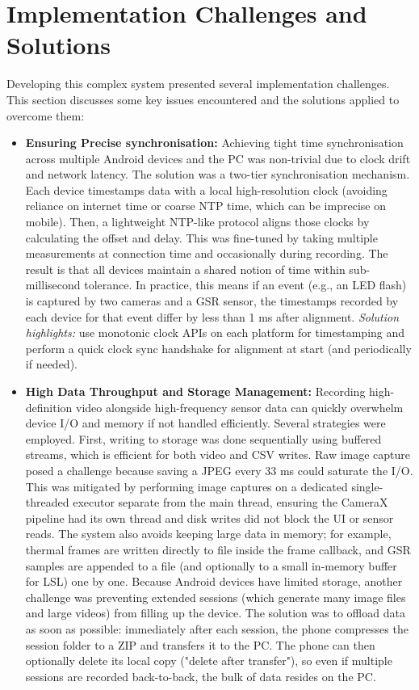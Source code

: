 \section{Implementation Challenges and Solutions}\label{sec:4-6}
Developing this complex system presented several implementation challenges. This section discusses some key issues encountered and the solutions applied to overcome them:

\begin{itemize}
    \item \textbf{Ensuring Precise synchronisation:} Achieving tight time synchronisation across multiple Android devices and the PC was non-trivial due to clock drift and network latency. The solution was a two-tier synchronisation mechanism. Each device timestamps data with a local high-resolution clock (avoiding reliance on internet time or coarse NTP time, which can be imprecise on mobile). Then, a lightweight NTP-like protocol aligns those clocks by calculating the offset and delay. This was fine-tuned by taking multiple measurements at connection time and occasionally during recording. The result is that all devices maintain a shared notion of time within sub-millisecond tolerance. In practice, this means if an event (e.g., an LED flash) is captured by two cameras and a GSR sensor, the timestamps recorded by each device for that event differ by less than 1 ms after alignment. \emph{Solution highlights:} use monotonic clock APIs on each platform for timestamping and perform a quick clock sync handshake for alignment at start (and periodically if needed).
    \item \textbf{High Data Throughput and Storage Management:} Recording high-definition video alongside high-frequency sensor data can quickly overwhelm device I/O and memory if not handled efficiently. Several strategies were employed. First, writing to storage was done sequentially using buffered streams, which is efficient for both video and CSV writes. Raw image capture posed a challenge because saving a JPEG every 33 ms could saturate the I/O. This was mitigated by performing image captures on a dedicated single-threaded executor separate from the main thread, ensuring the CameraX pipeline had its own thread and disk writes did not block the UI or sensor reads. The system also avoids keeping large data in memory; for example, thermal frames are written directly to file inside the frame callback, and GSR samples are appended to a file (and optionally to a small in-memory buffer for LSL) one by one. Because Android devices have limited storage, another challenge was preventing extended sessions (which generate many image files and large videos) from filling up the device. The solution was to offload data as soon as possible: immediately after each session, the phone compresses the session folder to a ZIP and transfers it to the PC. The phone can then optionally delete its local copy ("delete after transfer"), so even if multiple sessions are recorded back-to-back, the bulk of data resides on the PC.

\end{itemize}
